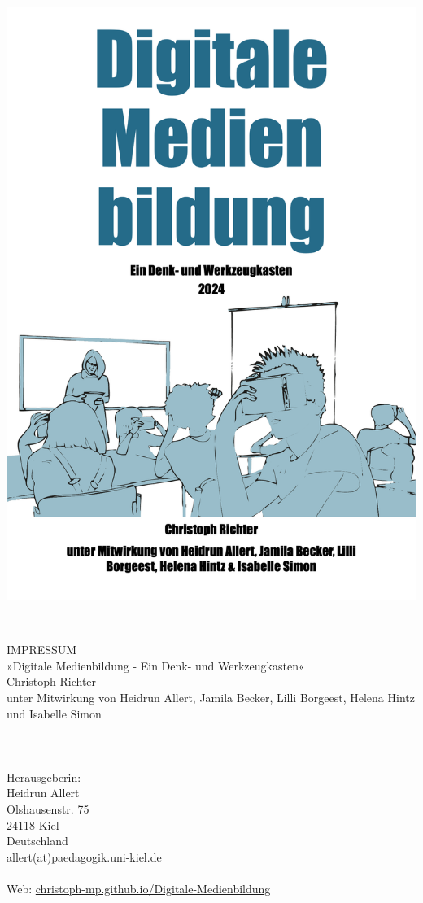 
\includegraphics[width=\textwidth, height=0.99\textheight]{Figures/Cover.png}


\newpage
~\vfill
\thispagestyle{empty}

\noindent IMPRESSUM\\
\noindent »Digitale Medienbildung - Ein Denk- und Werkzeugkasten«\\
\noindent Christoph Richter\\
\noindent unter Mitwirkung von Heidrun Allert, Jamila Becker, Lilli Borgeest, Helena Hintz und Isabelle Simon\\
\\
\\
\\
\noindent Herausgeberin:\\
Heidrun Allert\\
Olshausenstr. 75\\
24118 Kiel\\
Deutschland\\
allert(at)paedagogik.uni-kiel.de\\
\\
\noindent Web: \href{https://christoph-mp.github.io/Digitale-Medienbildung/}{christoph-mp.github.io/Digitale-Medienbildung}\\ %

